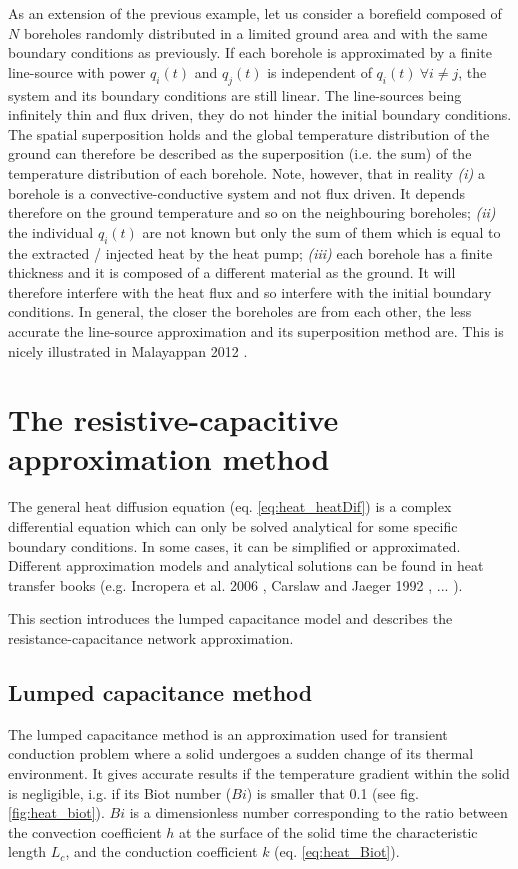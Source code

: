 \documentclass[a4paper,oneside,11pt]{report}
\begin{document}
As an extension of the previous example, let us consider a borefield composed of $N$ boreholes randomly distributed in a limited ground area and with the same boundary conditions as previously. If each borehole is approximated by a finite line-source with power $q_i(t)$ and $q_j(t)$ is independent of $q_i(t) \  \forall i \neq j$, the system and its boundary conditions are still linear. The line-sources being infinitely thin and flux driven, they do not hinder the initial boundary conditions. The spatial superposition holds and the global temperature distribution of the ground can therefore be described as the superposition (i.e. the sum) of the temperature distribution of each borehole. Note, however, that in reality \textit{(i)} a borehole is a convective-conductive system and not flux driven. It depends therefore on the ground temperature and so on the neighbouring boreholes; \textit{(ii)} the individual $q_i(t)$ are not known but only the sum of them which is equal to the extracted / injected heat by the heat pump; \textit{(iii)} each borehole has a finite thickness and it is composed of a different material as the ground. It will therefore interfere with the heat flux and so interfere with the initial boundary conditions. In general, the closer the boreholes are from each other, the less accurate the line-source approximation and its superposition method are. This is nicely illustrated in Malayappan 2012 \cite{mal12}.

\section{The resistive-capacitive approximation method} \label{sec:heat_rc}
The general heat diffusion equation (eq. \ref{eq:heat_heatDif}) is a complex differential equation which can only be solved analytical for some specific boundary conditions. In some cases, it can be simplified or approximated. Different approximation models and analytical solutions can be found in heat transfer books (e.g. Incropera et al. 2006 \cite{Inc06}, Carslaw and Jaeger 1992 \cite{jae59}, ... ).

This section introduces the lumped capacitance model and describes the resistance-capacitance network approximation.

	\subsection{Lumped capacitance method} \label{ssec:heat_lump}
The lumped capacitance method is an approximation used for transient conduction problem where a solid undergoes a sudden change of its thermal environment. It gives accurate results if the temperature gradient within the solid is negligible, i.g. if its Biot number ($Bi$) is smaller that 0.1 (see fig. \ref{fig:heat_biot}). $Bi$ is a dimensionless number corresponding to the ratio between the convection coefficient $h$ at the surface of the solid time the characteristic length $L_c$, and the conduction coefficient $k$ (eq. \ref{eq:heat_Biot}).
\end{document}
